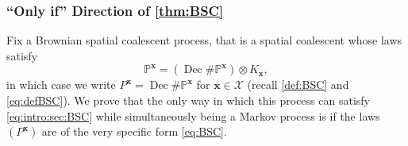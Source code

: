 \documentclass[reqno,draft]{amsart}
\numberwithin{equation}{section}
\theoremstyle{plain}
\newtheorem{corollary}[theorem]{Corollary}
\theoremstyle{remark}
\renewcommand{\P}{\mathbb{P}} %
\newcommand*\diff{\mathop{}\!\mathrm{d}}
\newcommand{\fpart}{\Pi} %
\newcommand{\semi}{S}
\DeclareMathOperator{\dc}{Dec}
\begin{document}
%
%


\subsubsection{``Only if'' Direction of \cref{thm:BSC}}

Fix a Brownian spatial coalescent process, that is a spatial coalescent whose laws satisfy 
\begin{equation}\label{eq:intro:sec:BSC}
    \P^{\boldsymbol x} = (\dc\#\P^{\boldsymbol x}) \otimes K_{\boldsymbol x},
\end{equation}
in which case we write $P^{\boldsymbol x} = \dc\#\P^{\boldsymbol x}$ for $\boldsymbol x\in \mathcal{X}$  (recall \cref{def:BSC} and \cref{eq:defBSC}). We prove that the only way in which this process can satisfy \eqref{eq:intro:sec:BSC} while simultaneously being a Markov process is if the laws $(P^{\boldsymbol x})$ are of the very specific form \cref{eq:BSC}.
\end{document}
